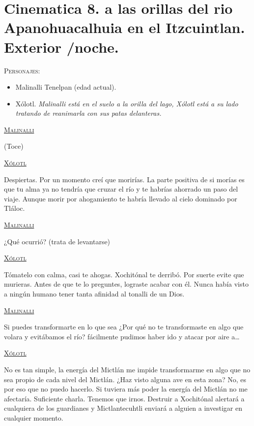 \section{Cinematica 8. a las orillas del rio Apanohuacalhuia en el Itzcuintlan. Exterior /noche.}
\label{Cin:Cinematica08}
 \textsc{Personajes}:
 \begin{itemize}
 	\item Malinalli Tenelpan (edad actual).
	\item Xólotl.
\textit{Malinalli está en el suelo a la orilla del lago, Xólotl está a su lado tratando de reanimarla con sus patas delanteras.}
 \end{itemize}
 
\begin{center}
\textsc{\underline{Malinalli}}
\\
\par
(Toce)
\\
\par
\textsc{\underline{Xólotl}}
\\
\par
Despiertas. Por un momento creí que morirías. La parte positiva de si morías es que tu alma ya no tendría que cruzar el río y te habrías ahorrado un paso del viaje. Aunque morir por ahogamiento te habría llevado al cielo dominado por Tláloc.
\\
\par
\textsc{\underline{Malinalli}}
\\
\par
¿Qué ocurrió? (trata de levantarse)
\\
\par
\textsc{\underline{Xólotl}}
\\
\par
Tómatelo con calma, casi te ahogas. Xochitónal te derribó. Por suerte evite que murieras. Antes de que te lo preguntes, lograste acabar con él. Nunca había visto a ningún humano tener tanta afinidad al tonalli de un Dios. 
\\
\par
\textsc{\underline{Malinalli}}
\\
\par
Si puedes transformarte en lo que sea ¿Por qué no te transformaste en algo que volara y evitábamos el río? fácilmente pudimos haber ido y atacar por aire a…
\\
\par
\textsc{\underline{Xólotl}}
\\
\par
No es tan simple, la energía del Mictlán me impide transformarme en algo que no sea propio de cada nivel del Mictlán. ¿Haz visto alguna ave en esta zona? No, es por eso que no puedo hacerlo. Si tuviera más poder la energía del Mictlán no me afectaría. Suficiente charla. Tenemos que irnos. Destruir a Xochitónal alertará a cualquiera de los guardianes y Mictlantecuhtli enviará a alguien a investigar en cualquier momento.

\end{center}